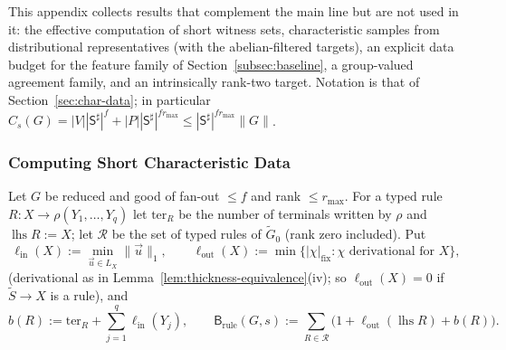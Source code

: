 \documentclass[11pt]{article}
\numberwithin{equation}{section}
\theoremstyle{plain}
\theoremstyle{definition}
\theoremstyle{remark}
\newcommand{\tuple}[1]{\vec{#1}}
\theoremstyle{plain}
\begin{document}
\label{app:supplementary}

This appendix collects results that complement the main line but are not
used in it: the effective computation of short witness sets, characteristic
samples from distributional representatives (with the abelian-filtered
targets), an explicit data budget for the feature family of
Section~\ref{subsec:baseline}, a group-valued agreement family, and an
intrinsically rank-two target.  Notation is that of
Section~\ref{sec:char-data}; in particular
$C_s(G)=|V||\mathsf S^\sharp|^f+|P||\mathsf S^\sharp|^{fr_{\max}}\le
|\mathsf S^\sharp|^{fr_{\max}}\|G\|$.

\subsubsection{Computing Short Characteristic Data}
\label{subsec:effective-char-data}

Let $G$ be reduced and good of fan-out $\le f$ and rank $\le r_{\max}$.  For a
typed rule $R:X\to\rho(Y_1,\ldots,Y_q)$ let $\mathrm{ter}_R$ be the number of terminals
written by $\rho$ and $\operatorname{lhs}R:=X$; let $\mathcal R$ be the set of
typed rules of $\widetilde G_0$ (rank zero included).  Put
\[
 \ell_{\mathrm{in}}(X):=\min_{\tuple u\in L_X}\|\tuple u\|_1,\qquad
 \ell_{\mathrm{out}}(X):=\min\{|\chi|_{\mathrm{fix}}:\chi\text{ derivational for }X\},
\]
(derivational as in Lemma~\ref{lem:thickness-equivalence}(iv); so
$\ell_{\mathrm{out}}(X)=0$ if $\widetilde S\to X$ is a rule), and
\[
 b(R):=\mathrm{ter}_R+\sum_{j=1}^q\ell_{\mathrm{in}}(Y_j),\qquad
 \mathsf B_{\mathrm{rule}}(G,s):=
 \sum_{R\in\mathcal R}\bigl(1+\ell_{\mathrm{out}}(\operatorname{lhs}R)+b(R)\bigr).
\]
\end{document}
